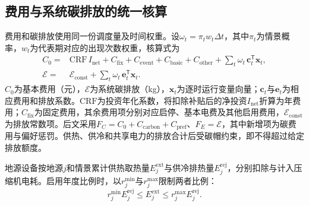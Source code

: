 \subsection{费用与系统碳排放的统一核算}

费用和碳排放使用同一份调度量及时间权重。设$\omega_t=\pi_t w_t\Delta t$，其中$\pi_t$为情景概率，$w_t$为代表期对应的出现次数权重，核算式为
\begin{equation}
\begin{aligned}
C_0={}&\mathrm{CRF}\,I_{\mathrm{net}}+C_{\mathrm{fix}}+C_{\mathrm{event}}+C_{\mathrm{basic}}+C_{\mathrm{other}}
+\sum_t\omega_t\,\boldsymbol c_t^\mathsf T\boldsymbol x_t,\\
\mathcal E={}&\mathcal E_{\mathrm{const}}+\sum_t\omega_t\,\boldsymbol e_t^\mathsf T\boldsymbol x_t .
\end{aligned}
\label{eq:scoring-ledger}
\end{equation}
$C_0$为基本费用（元），$\mathcal E$为系统碳排放（kg），$\boldsymbol x_t$为逐时运行变量向量；$\boldsymbol c_t$与$\boldsymbol e_t$为相应费用和排放系数。$\mathrm{CRF}$为投资年化系数，将扣除补贴后的净投资$I_{\mathrm{net}}$折算为年费用；$C_{\mathrm{fix}}$为固定费用，其余费用项分别对应启停、基本电费及其他启用费用，$\mathcal E_{\mathrm{const}}$为排放常数项。后文采用$F_C=C_0+C_{\mathrm{carbon}}+C_{\mathrm{pref}}$、$F_E=\mathcal E$，其中新增项为碳费用与偏好惩罚。供热、供冷和共享电力的排放合计后受碳帽约束，即不得超过给定排放额度。

地源设备按地源$j$和情景累计供热取热量$E_j^{\mathrm{ext}}$与供冷排热量$E_j^{\mathrm{rej}}$，分别扣除与计入压缩机电耗。启用年度比例时，以$r_j^{\min}$与$r_j^{\max}$限制两者比例：
\begin{equation}
r_j^{\min}E_j^{\mathrm{rej}}\leq E_j^{\mathrm{ext}}
\leq r_j^{\max}E_j^{\mathrm{rej}} .
\label{eq:ground-ledger}
\end{equation}
